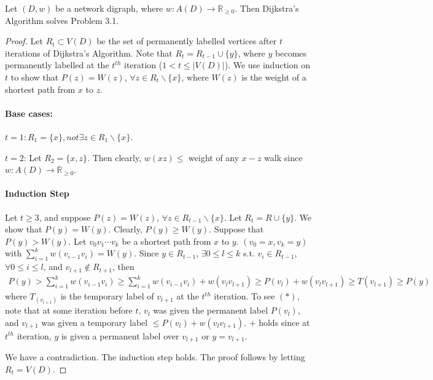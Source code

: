 \begin{theorem}
    Let $(D, w)$ be a network digraph, where $w:A(D)\to\mathbb{R}_{\geqslant 0}$. Then Dijkstra's Algorithm solves Problem 3.1.
\end{theorem}
\begin{proof}
    Let $R_t\subset V(D)$ be the set of permanently labelled vertices after $t$ iterations of Dijkstra's Algorithm. Note that $R_t = R_{t-1}\cup\{y\}$, where $y$ becomes permanently labelled at the $t^{th}$ iteration ($1<t\leqslant |V(D)|$). We use induction on $t$ to show that $P(z) = W(z)$, $\forall z\in R_t\backslash \{x\}$, where $W(z)$ is the weight of a shortest path from $x$ to $z$.

   \paragraph{Base cases:} $t=1: R_1=\{x\}, not \exists z\in R_1\backslash\{x\}$.

   $t = 2$: Let $R_2=\{x, z\}$. Then clearly, $w(xz) \leqslant$ weight of any $x-z$ walk since $w:A(D)\to \mathbb{R}_{\geqslant 0}$.

   \paragraph{Induction Step} Let $t\geqslant 3$, and suppose $P(z) = W(z)$, $\forall z\in R_{t-1}\backslash\{x\}$. Let $R_t = R\cup\{y\}$. We show that $P(y) = W(y)$. Clearly, $P(y)\geqslant W(y)$. Suppose that $P(y)>W(y)$. Let $v_0 v_1\cdots v_k$ be a shortest path from $x$ to $y$. $(v_0 = x, v_k = y)$ with $\sum\limits_{i=1}^k w(v_{i-1} v_i) = W(y)$. Since $y\in R_{t-1}$, $\exists 0\leqslant l\leqslant k$ s.t. $v_i\in R_{t-1}$, $\forall 0\leqslant i\leqslant l$, and $v_{l+1}\notin R_{t+1}$, then 
   \begin{align*}
       P(y) > \sum\limits_{i=1}^k w(v_{i-1}v_i) \geqslant \sum\limits_{i=1}^k w(v_{i-1}v_i) + w(v_l v_{l+1}) \geqslant P(v_l) + w(v_lv_{l+1}) \geqslant T(v_{l+1}) \geqslant P(y)
   \end{align*}
    where $T_(v_{l+1})$ is the temporary label of $v_{l+1}$ at the $t^{th}$ iteration. To see $(*)$, note that at some iteration before $t$, $v_l$ was given the permanent label $P(v_l)$, and $v_{l+1}$ was given a temporary label $\leqslant P(v_l) + w(v_l v_{l+1})$. $+$ holds since at $t^{th}$ iteration, $y$ is given a permanent label over $v_{l+1}$ or $y=v_{l+1}$.

    We have a contradiction. The induction step holds. The proof follows by letting $R_t = V(D)$.
\end{proof}

